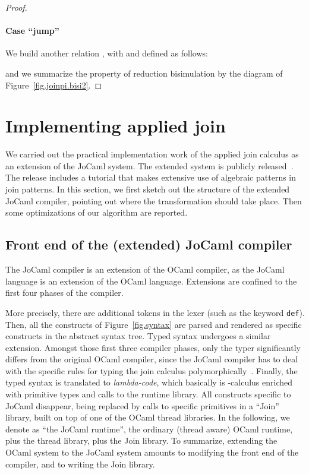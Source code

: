 \documentclass{LMCS}
\let \lst \lstinline
\newcommand{\forget}[1]{}
\newcommand{\jocaml}{\textrm{JoCaml}\xspace}
\newcommand{\ocaml}{\textrm{OCaml}\xspace}
\renewcommand{\_}{\mathord{\rule[-.25ex]{1ex}{.15ex}}}
\begin{document}
\begin{proof}
  \paragraph{\bf Case ``jump''} 
  We build another relation , with  and  defined as
  follows:
  
  and we summarize the property of reduction bisimulation by the diagram of
  Figure~\ref{fig.joinpi.bisi2}. \forget{\qed}
\end{proof}

\section{Implementing applied join}
\label{sec.imp}

We carried out the practical implementation work of the applied join
calculus as an extension of the \jocaml system.
The extended system is publicly released~\cite{JoCaml}.
The release includes a tutorial that makes extensive use of
algebraic patterns in join patterns.
In this section, we
first sketch out the structure of the extended \jocaml compiler,
pointing out where the transformation should take place. Then some
optimizations of our algorithm  are reported.

\subsection{Front end of the (extended) \jocaml compiler}
\label{subsec.frontend}

The \jocaml compiler is an extension of the \ocaml compiler,
as the \jocaml language is an extension of the \ocaml language.
Extensions are confined to the first four phases of the compiler.

More precisely, there are additional tokens in the lexer (such as the
keyword \lst|def|).  Then, all the constructs of
Figure~\ref{fig.syntax} are parsed and rendered as specific constructs
in the abstract syntax tree. Typed syntax undergoes a
similar extension. Amongst those first three compiler phases, only the
typer significantly differs from the original \ocaml compiler, since
the \jocaml compiler has to deal with the specific rules for typing
the join calculus
polymorphically~\cite{Fournet-Laneve-Maranget-Remy:typing-join}.
Finally, the typed syntax is translated to \emph{lambda-code}, which
basically is -calculus enriched with primitive types and calls
to the runtime library.  All constructs specific to \jocaml disappear,
being replaced by calls to specific primitives in a ``\textsf{Join}''
library, built on top of one of the \ocaml thread libraries.  In the
following, we denote as ``the \jocaml runtime'', the ordinary (thread
aware) \ocaml runtime, plus the thread library, plus the \textsf{Join}
library. To summarize, extending the \ocaml system to the \jocaml
system amounts to modifying the front end of the compiler, and to
writing the \textsf{Join} library.
\end{document}
